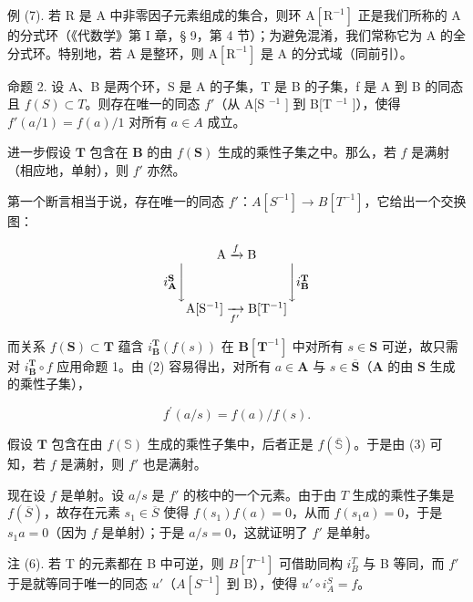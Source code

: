 例 (7). 若 R 是 A 中非零因子元素组成的集合，则环 \(\mathrm{A}[\mathrm{R}^{-1}]\) 正是我们所称的 A 的分式环（《代数学》第 I 章，§ 9，第 4 节）；为避免混淆，我们常称它为 A 的全分式环。特别地，若 A 是整环，则 \(\mathrm{A}[\mathrm{R}^{-1}]\) 是 A 的分式域（同前引）。

命题 2. 设 A、B 是两个环，S 是 A 的子集，T 是 B 的子集，f 是 A 到 B 的同态且 \(f(S) \subset T\)。则存在唯一的同态 \(f'\)（从 A{[}S \(^{-1}\) {]} 到 B{[}T \(^{-1}\) {]}），使得 \(f'(a/1) = f(a)/1\) 对所有 \(a \in A\) 成立。

进一步假设 \(\mathbf{T}\) 包含在 \(\mathbf{B}\) 的由 \(f(\mathbf{S})\) 生成的乘性子集之中。那么，若 \(f\) 是满射（相应地，单射），则 \(f'\) 亦然。

第一个断言相当于说，存在唯一的同态 \(f'\)：\(A[S^{-1}] \to B[T^{-1}]\)，它给出一个交换图：

\[
\begin{array}{c} \mathrm{A} \xrightarrow {f} \mathrm{B} \\ i _ {\mathbf {A}} ^ {\mathbf {S}} \Biggl \downarrow \qquad \qquad \qquad \qquad \Biggl \downarrow i _ {\mathbf {B}} ^ {\mathbf {T}} \\ \mathrm{A} [ \mathrm{S} ^ {- 1} ] \xrightarrow [ f ^ {\prime} ]{} \mathrm{B} [ \mathrm{T} ^ {- 1} ] \end{array}
\]

而关系 \(f(\mathbf{S}) \subset \mathbf{T}\) 蕴含 \(i_{\mathbf{B}}^{\mathbf{T}}(f(s))\) 在 \(\mathbf{B}[\mathbf{T}^{-1}]\) 中对所有 \(s \in \mathbf{S}\) 可逆，故只需对 \(i_{\mathbf{B}}^{\mathbf{T}} \circ f\) 应用命题 1。由 (2) 容易得出，对所有 \(a \in \mathbf{A}\) 与 \(s \in \overline{\mathbf{S}}\)（\(\mathbf{A}\) 的由 \(\mathbf{S}\) 生成的乘性子集），

\[
f ^ {\prime} (a / s) = f (a) / f (s).\tag{3}
\]

假设 \(\mathbf{T}\) 包含在由 \(f(\mathbb{S})\) 生成的乘性子集中，后者正是 \(f(\overline{\mathbb{S}})\)。于是由 (3) 可知，若 \(f\) 是满射，则 \(f'\) 也是满射。

现在设 \(f\) 是单射。设 \(a / s\) 是 \(f'\) 的核中的一个元素。由于由 \(T\) 生成的乘性子集是 \(f(\overline{S})\)，故存在元素 \(s_1 \in \overline{S}\) 使得 \(f(s_1)f(a) = 0\)，从而 \(f(s_1a) = 0\)，于是 \(s_1a = 0\)（因为 \(f\) 是单射）；于是 \(a / s = 0\)，这就证明了 \(f'\) 是单射。

注 (6). 若 T 的元素都在 B 中可逆，则 \(B[T^{-1}]\) 可借助同构 \(i_{B}^{T}\) 与 B 等同，而 \(f'\) 于是就等同于唯一的同态 \(u'\)（\(A[S^{-1}]\) 到 B），使得 \(u' \circ i_{A}^{S} = f\)。

